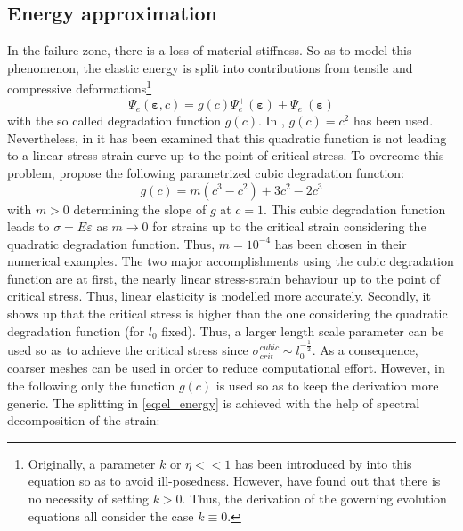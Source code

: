 \subsection{Energy approximation} \label{sec:energy_approx}
In the failure zone, there is a loss of material stiffness. So as to model this phenomenon, the elastic energy is split into contributions from tensile and compressive deformations\footnote{Originally, a parameter $k$ or $\eta<<1$ has been introduced by \citet{09_PF_k} into this equation so as to avoid ill-posedness. However, \citet{01_PF_dyn_brittle} have found out that there is no necessity of setting $k>0$. Thus, the derivation of the governing evolution equations all consider the case $k\equiv0$.}
\begin{equation} \label{eq:el_energy}
	\Psi_{e}\left(\bm{\varepsilon},c\right)=g\left(c\right) \Psi_{e}^{+}\left(\bm{\varepsilon}\right)+\Psi_{e}^{-}\left(\bm{\varepsilon}\right)
\end{equation}
with the so called degradation function $g\left(c\right)$. In \cite{01_PF_dyn_brittle}, $g\left(c\right)=c^{2}$ has been used. Nevertheless, in \citep{03_PF_ductile} it has been examined that this quadratic function is not leading to a linear stress-strain-curve up to the point of critical stress. To overcome this problem, \citet{03_PF_ductile} propose the following parametrized cubic degradation function:
\begin{equation} \label{eq:cubic_degr_fct}
	g\left(c\right)=m\left(c^{3}-c^{2}\right)+3c^{2}-2c^{3}
\end{equation}
with $m>0$ determining the slope of $g$ at $c=1$. This cubic degradation function leads to $\sigma=E\varepsilon$ as $m\rightarrow0$ for strains up to the critical strain considering the quadratic degradation function. Thus, $m=10^{-4}$ has been chosen in their numerical examples. The two major accomplishments using the cubic degradation function are at first, the nearly linear stress-strain behaviour up to the point of critical stress. Thus, linear elasticity is modelled more accurately. Secondly, it shows up that the critical stress is higher than the one considering the quadratic degradation function (for $l_{0}$ fixed). Thus, a larger length scale parameter can be used so as to achieve the critical stress since $\sigma_{crit}^{cubic}\sim l_{0}^{-\frac{1}{2}}$. As a consequence, coarser meshes can be used in order to reduce computational effort. However, in the following only the function $g\left(c\right)$ is used so as to keep the derivation more generic. The splitting in \eqref{eq:el_energy} is achieved with the help of spectral decomposition of the strain:
